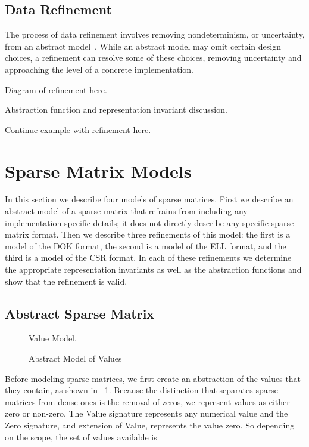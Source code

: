 \documentclass[11pt,conference]{IEEEtran}
\begin{document}
\subsection{Data Refinement}

The process of data refinement involves removing nondeterminism, or uncertainty, from an abstract model~\cite{woodcock1996}.  While an abstract model may omit certain design choices, a refinement can resolve some of these choices, removing uncertainty and approaching the level of a concrete implementation.

Diagram of refinement here.

Abstraction function and representation invariant discussion.

Continue example with refinement here.

\section{Sparse Matrix Models}

In this section we describe four models of sparse matrices.  First we describe an abstract model of a sparse matrix that refrains from including any implementation specific details; it does not directly describe any specific sparse matrix format.  Then we describe three refinements of this model: the first is a model of the DOK format, the second is a model of the ELL format, and the third is a model of the CSR format.  In each of these refinements we determine the appropriate representation invariants as well as the abstraction functions and show that the refinement is valid.

\subsection{Abstract Sparse Matrix}

\begin{figure}
\centering
Value Model.
\caption{Abstract Model of Values}
\label{mod:value}
\end{figure}

Before modeling sparse matrices, we first create an abstraction of the values that they contain, as shown in \figurename~\ref{mod:value}.  Because the distinction that separates sparse matrices from dense ones is the removal of zeros, we represent values as either zero or non-zero.  The Value signature represents any numerical value and the Zero signature, and extension of Value, represents the value zero.  So depending on the scope, the set of values available is
\end{document}
